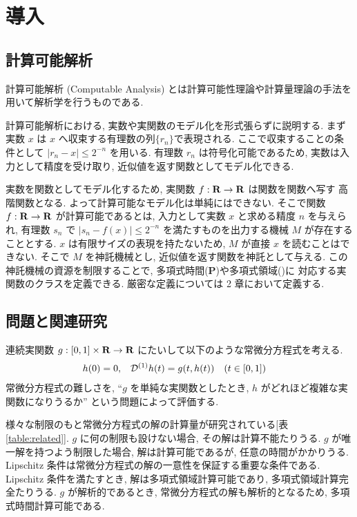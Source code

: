 \section{導入}

\subsection{計算可能解析}

計算可能解析 (Computable Analysis) とは計算可能性理論や計算量理論の手法を用いて解析学を行うものである. 

計算可能解析における, 実数や実関数のモデル化を形式張らずに説明する.
まず実数 $x$ は $x$ へ収束する有理数の列$\{r_n\}$で表現される. 
ここで収束することの条件として $|r_n - x| \le 2^{-n}$ を用いる.
有理数 $r_n$ は符号化可能であるため, 実数は入力として精度を受け取り,
近似値を返す関数としてモデル化できる.

実数を関数としてモデル化するため, 実関数 $f:\mathbf R \to \mathbf R$ は関数を関数へ写す
高階関数となる. よって計算可能なモデル化は単純にはできない.
そこで関数 $f:\mathbf R \to \mathbf R$ が計算可能であるとは,
入力として実数 $x$ と求める精度 $n$ を与えられ,
有理数 $s_n$ で $|s_n - f(x)| \le 2^{-n}$ を満たすものを出力する機械 $M$ が存在することとする.
$x$ は有限サイズの表現を持たないため, $M$ が直接 $x$ を読むことはできない.
そこで $M$ を神託機械とし, 近似値を返す関数を神託として与える.
この神託機械の資源を制限することで, 多項式時間({\bf P})や多項式領域(\PSPACE)に
対応する実関数のクラスを定義できる.
厳密な定義については 2 章において定義する.

\subsection{問題と関連研究}


連続実関数 $g : [0,1] \times \mathbf R \to \mathbf R$ にたいして以下のような常微分方程式を考える. 
\begin{align}
 \label{eq:ode}
 h(0) & = 0, &
 \mathcal D^{(1)} h(t) & = g(t,h(t)) \quad (t \in [0,1])
\end{align}
常微分方程式の難しさを, ``$g$ を単純な実関数としたとき, 
$h$ がどれほど複雑な実関数になりうるか'' という問題によって評価する.

様々な制限のもと常微分方程式の解の計算量が研究されている[表 \ref{table:related}].
$g$ に何の制限も設けない場合, その解は計算不能たりうる.
$g$ が唯一解を持つよう制限した場合, 解は計算可能であるが, 任意の時間がかかりうる.
Lipschitz 条件は常微分方程式の解の一意性を保証する重要な条件である.
Lipschitz 条件を満たすとき, 解は多項式領域計算可能であり, 多項式領域計算完全たりうる.
$g$ が解析的であるとき, 常微分方程式の解も解析的となるため, 多項式時間計算可能である.

